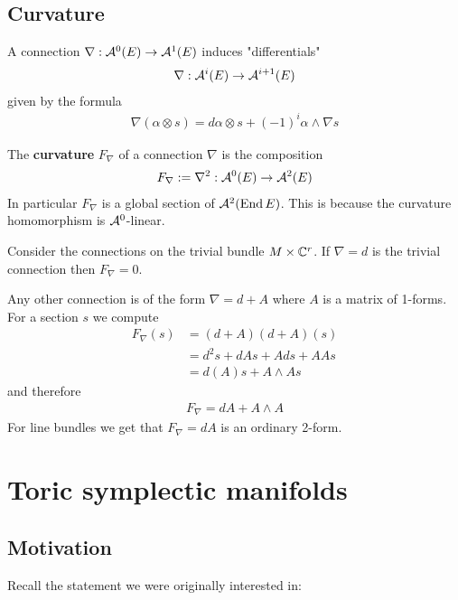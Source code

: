 \documentclass[12pt]{article}
\begin{document}
\subsection{Curvature}

A connection $\nabla:{\mathcal{A}}^0(E)\to {\mathcal{A}}^1(E)$ induces "differentials" \begin{align*}
    \nabla:{\mathcal{A}}^i(E)\to{\mathcal{A}}^{i+1}(E)
\end{align*} given by the formula \begin{align*}
    \nabla(\alpha\otimes s) = d\alpha\otimes s + (-1)^i\alpha\wedge\nabla s
\end{align*}

\begin{definition}
    The \textbf{curvature} $F_\nabla$ of a connection $\nabla$ is the composition \begin{align*}
        F_\nabla := \nabla^2:{\mathcal{A}}^0(E)\to{\mathcal{A}}^2(E)
    \end{align*} In particular $F_\nabla$ is a global section of ${\mathcal{A}}^2(\operatorname{End} E)$. This is because 
    the curvature homomorphism is ${\mathcal{A}}^0$-linear.
\end{definition}

\begin{example}
    Consider the connections on the trivial bundle $M\times \mathbb{C}^r$. If $\nabla = d$ is the
    trivial connection then $F_\nabla = 0$. 

    \hfill 

    Any other connection is of the form $\nabla = d + A$ where $A$ is a matrix of 1-forms. For a section
    $s$ we compute \begin{align*}
        F_\nabla(s) &= (d+A)(d+A)(s) \\
        &= d^2s + dAs + Ads + AAs \\
        &= d(A)s + A\wedge As
    \end{align*} and therefore \begin{align*}
        F_\nabla = dA + A\wedge A
    \end{align*}
    For line bundles we get that $F_\nabla = dA$ is an ordinary 2-form.
\end{example}

\section{Toric symplectic manifolds}
\subsection{Motivation}
Recall the statement we were originally interested in: 
\end{document}
